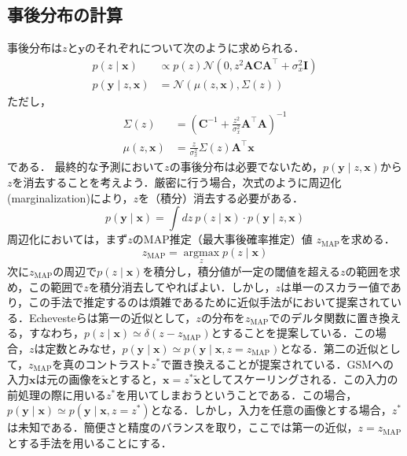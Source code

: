 \subsection{事後分布の計算}
事後分布は$z$と$\mathbf{y}$のそれぞれについて次のように求められる．
\begin{align}
p(z \mid \mathbf{x}) &\propto p(z) \mathcal{N}\left(0, z^{2} \mathbf{A C A}^{\top}+\sigma_{x}^{2} \mathbf{I}\right)\\
p(\mathbf{y} \mid z, \mathbf{x})& = \mathcal{N}\left(\mu(z, \mathbf{x}), \Sigma(z)\right)
\end{align}
ただし，
\begin{align}
\Sigma(z)&=\left(\mathbf{C}^{-1}+\frac{z^{2}}{\sigma_{x}^{2}} \mathbf{A}^{\top} \mathbf{A}\right)^{-1}\\
\mu(z, \mathbf{x})&=\frac{z}{\sigma_{x}^{2}} \Sigma(z) \mathbf{A}^{\top} \mathbf{x}
\end{align}
である．
最終的な予測において$z$の事後分布は必要でないため，$p(\mathbf{y} \mid z, \mathbf{x})$から$z$を消去することを考えよう．厳密に行う場合，次式のように周辺化(marginalization)により，$z$を（積分）消去する必要がある．
\begin{equation}
p(\mathbf{y} \mid \mathbf{x}) = \int dz\ p(z\mid \mathbf{x})\cdot p(\mathbf{y} \mid z, \mathbf{x})
\end{equation}
周辺化においては，まず$z$のMAP推定（最大事後確率推定）値 $z_{\mathrm{MAP}}$を求める．
\begin{equation}
z_{\mathrm{MAP}} = \underset{z}{\operatorname{argmax}} p(z\mid \mathbf{x})
\end{equation}
次に$z_{\mathrm{MAP}}$の周辺で$p(z\mid \mathbf{x})$を積分し，積分値が一定の閾値を超える$z$の範囲を求め，この範囲で$z$を積分消去してやればよい．しかし，$z$は単一のスカラー値であり，この手法で推定するのは煩雑であるために近似手法が\citep{Echeveste2017-wu}において提案されている．Echevesteらは第一の近似として，$z$の分布を$z_{\mathrm{MAP}}$でのデルタ関数に置き換える，すなわち，$p(z\mid \mathbf{x})\simeq \delta (z-z_{\mathrm{MAP}})$とすることを提案している．この場合，$z$は定数とみなせ，$p(\mathbf{y} \mid \mathbf{x})\simeq p(\mathbf{y} \mid \mathbf{x}, z=z_{\mathrm{MAP}})$となる．第二の近似として，$z_{\mathrm{MAP}}$を真のコントラスト$z^*$で置き換えることが提案されている．GSMへの入力$\mathbf{x}$は元の画像を$\mathbf{\tilde x}$とすると，$\mathbf{x}=z^* \mathbf{\tilde x}$としてスケーリングされる．この入力の前処理の際に用いる$z^*$を用いてしまおうということである．この場合，$p(\mathbf{y} \mid \mathbf{x})\simeq p(\mathbf{y} \mid \mathbf{x}, z=z^*)$となる．しかし，入力を任意の画像とする場合，$z^*$は未知である．簡便さと精度のバランスを取り，ここでは第一の近似，$z=z_{\mathrm{MAP}}$とする手法を用いることにする．
